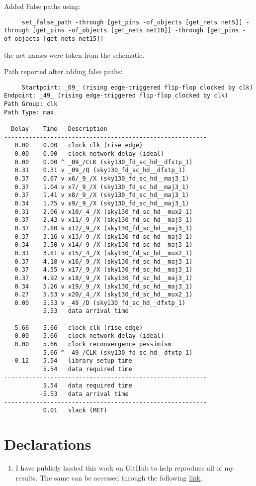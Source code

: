 \documentclass[12pt,a4paper]{article}
\begin{document}
Added False paths using:
\begin{verbatim}
     set_false_path -through [get_pins -of_objects [get_nets net5]] -through [get_pins -of_objects [get_nets net10]] -through [get_pins -of_objects [get_nets net15]]
\end{verbatim}

\noindent the net names were taken from the schematic.

Path reported after adding false paths:

\begin{verbatim}
     Startpoint: _09_ (rising edge-triggered flip-flop clocked by clk)
Endpoint: _49_ (rising edge-triggered flip-flop clocked by clk)
Path Group: clk
Path Type: max

  Delay    Time   Description
---------------------------------------------------------
   0.00    0.00   clock clk (rise edge)
   0.00    0.00   clock network delay (ideal)
   0.00    0.00 ^ _09_/CLK (sky130_fd_sc_hd__dfxtp_1)
   0.31    0.31 v _09_/Q (sky130_fd_sc_hd__dfxtp_1)
   0.37    0.67 v x6/_9_/X (sky130_fd_sc_hd__maj3_1)
   0.37    1.04 v x7/_9_/X (sky130_fd_sc_hd__maj3_1)
   0.37    1.41 v x8/_9_/X (sky130_fd_sc_hd__maj3_1)
   0.34    1.75 v x9/_9_/X (sky130_fd_sc_hd__maj3_1)
   0.31    2.06 v x10/_4_/X (sky130_fd_sc_hd__mux2_1)
   0.37    2.43 v x11/_9_/X (sky130_fd_sc_hd__maj3_1)
   0.37    2.80 v x12/_9_/X (sky130_fd_sc_hd__maj3_1)
   0.37    3.16 v x13/_9_/X (sky130_fd_sc_hd__maj3_1)
   0.34    3.50 v x14/_9_/X (sky130_fd_sc_hd__maj3_1)
   0.31    3.81 v x15/_4_/X (sky130_fd_sc_hd__mux2_1)
   0.37    4.18 v x16/_9_/X (sky130_fd_sc_hd__maj3_1)
   0.37    4.55 v x17/_9_/X (sky130_fd_sc_hd__maj3_1)
   0.37    4.92 v x18/_9_/X (sky130_fd_sc_hd__maj3_1)
   0.34    5.26 v x19/_9_/X (sky130_fd_sc_hd__maj3_1)
   0.27    5.53 v x20/_4_/X (sky130_fd_sc_hd__mux2_1)
   0.00    5.53 v _49_/D (sky130_fd_sc_hd__dfxtp_1)
           5.53   data arrival time

   5.66    5.66   clock clk (rise edge)
   0.00    5.66   clock network delay (ideal)
   0.00    5.66   clock reconvergence pessimism
           5.66 ^ _49_/CLK (sky130_fd_sc_hd__dfxtp_1)
  -0.12    5.54   library setup time
           5.54   data required time
---------------------------------------------------------
           5.54   data required time
          -5.53   data arrival time
---------------------------------------------------------
           0.01   slack (MET)
\end{verbatim}

\section{Declarations}
\begin{enumerate}
    \item I have publicly hosted this work on GitHub to help reproduce all of my results. The same can be accessed through the following \href{https://github.com/iamkarthikbk/ee5311-2025}{\underline{link}}.
\end{enumerate}
\end{document}
